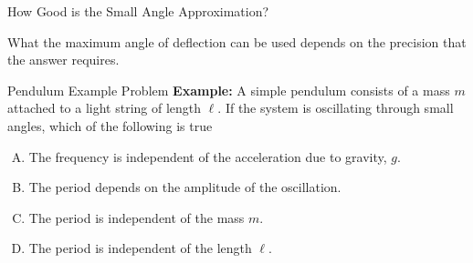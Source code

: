 \documentclass[12pt,compress,aspectratio=169]{beamer}
\begin{document}
\begin{frame}{How Good is the Small Angle Approximation?}
  \begin{center}
  \end{center}
  What the maximum angle of deflection can be used depends on the precision
  that the answer requires.
\end{frame}



\begin{frame}{Pendulum Example Problem}
  \textbf{Example:} A simple pendulum consists of a mass $m$ attached to a
  light string of length $\ell$. If the system is oscillating through small
  angles, which of the following is true
  \begin{enumerate}[(A)]
  \item The frequency is independent of the acceleration due to gravity, $g$.
  \item The period depends on the amplitude of the oscillation.
  \item The period is independent of the mass $m$.
  \item The period is independent of the length $\ell$.
  \end{enumerate}
\end{frame}
\end{document}
